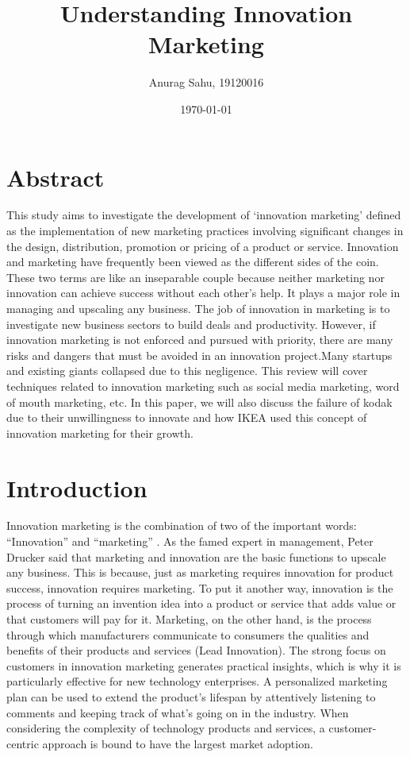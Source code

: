 \documentclass{article}
\title{Understanding Innovation Marketing}
\author{Anurag Sahu, 19120016}
\date{\today}
\begin{document}
\maketitle


\section{Abstract}

This study aims to investigate the development of ‘innovation marketing’ defined as the 
implementation of new marketing practices involving significant changes in the design,
distribution, promotion or pricing of a product or service.
Innovation and marketing have frequently been viewed as the different sides of the coin. These two terms are like an 
inseparable couple because neither marketing nor innovation can achieve success without each other's help.
It plays a major role in managing and upscaling any business.
The job of innovation in marketing is to investigate new business sectors to build deals and productivity.
However, if innovation marketing is not enforced and pursued with
priority, there are many risks and dangers that must be avoided in an innovation project.Many startups and
existing giants collapsed due to this negligence. This review
will cover techniques related to innovation marketing such as social media marketing,
word of mouth marketing, etc. In this paper, we will also discuss the failure of kodak due
to their unwillingness to innovate and how IKEA used this concept of innovation
marketing for their growth.

\section{Introduction}

Innovation marketing is the combination
of two of the important words:
“Innovation” and “marketing” . As the
famed expert in management, Peter
Drucker said that marketing and
innovation are the basic functions to
upscale any business. This is because,
just as marketing requires innovation for
product success, innovation requires
marketing.
To put it another way, innovation is the
process of turning an invention idea into a
product or service that adds value or that
customers will pay for it. Marketing, on the other hand, is the process through which manufacturers communicate to consumers the qualities and benefits of their products
and services (Lead Innovation).
The strong focus on customers in innovation marketing generates practical insights,
which is why it is particularly effective for new technology enterprises. A personalized
marketing plan can be used to extend the product's lifespan by attentively listening to
comments and keeping track of what's going on in the industry. When considering the
complexity of technology products and services, a customer-centric approach is bound
to have the largest market adoption.
\end{document}
